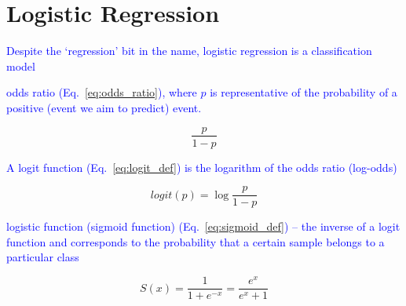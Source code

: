 \section{Logistic Regression}

\textcolor{blue}{Despite the `regression' bit in the name, logistic regression is a classification model}

\textcolor{blue}{odds ratio (Eq.~\ref{eq:odds_ratio}), where $p$ is representative of the probability of a positive (event we aim to predict) event.}

\begin{equation}
{\frac{p}{1-p}}
\label{eq:odds_ratio}
\end{equation}

\textcolor{blue}{A logit function (Eq.~\ref{eq:logit_def}) is the logarithm of the odds ratio (log-odds)}

\begin{equation}
{logit(p)=\log{\frac{p}{1-p}}}
\label{eq:logit_def}
\end{equation}

\textcolor{blue}{logistic function (sigmoid function) (Eq.~\ref{eq:sigmoid_def}) -- the inverse of a logit function and corresponds to the probability that a certain sample belongs to a particular class}

\begin{equation}
{S(x)={\frac{1}{1+e^{-x}}}={\frac{e^x}{e^x+1}}}
\label{eq:sigmoid_def}
\end{equation}
